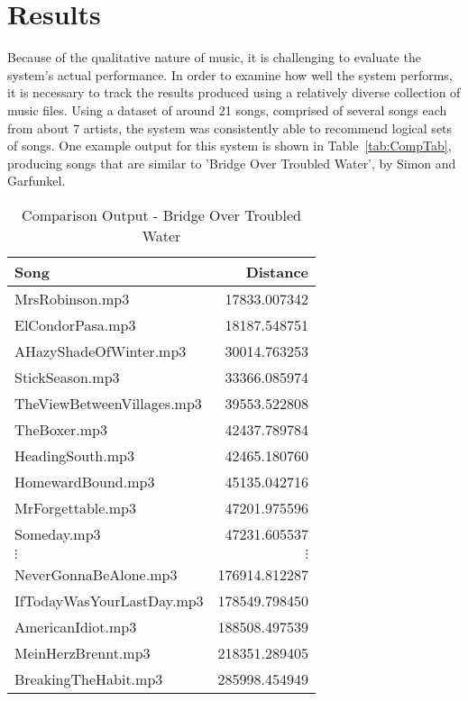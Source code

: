 \documentclass[conference]{IEEEtran}
\begin{document}
\section{Results}\label{sec:results}
Because of the qualitative nature of music, it is challenging to evaluate the system's actual performance. In order to examine how well the system performs, it is necessary to track the results produced using a relatively diverse collection of music files. Using a dataset of around 21 songs, comprised of several songs each from about 7 artists, the system was consistently able to recommend logical sets of songs. One example output for this system is shown in Table~\eqref{tab:CompTab}, producing songs that are similar to 'Bridge Over Troubled Water', by Simon and Garfunkel.

\begin{table}[htbp]
    \centering
    \caption{Comparison Output - Bridge Over Troubled Water}\label{tab:CompTab}
    \begin{tabular}{lr}
      \toprule
      \textbf{Song} & \textbf{Distance} \\
      \midrule
      MrsRobinson.mp3 & 17833.007342 \\
      ElCondorPasa.mp3 & 18187.548751 \\
      AHazyShadeOfWinter.mp3 & 30014.763253 \\
      StickSeason.mp3 & 33366.085974 \\
      TheViewBetweenVillages.mp3 & 39553.522808 \\
      TheBoxer.mp3 & 42437.789784 \\
      HeadingSouth.mp3 & 42465.180760 \\
      HomewardBound.mp3 & 45135.042716 \\
      MrForgettable.mp3 & 47201.975596 \\
      Someday.mp3 & 47231.605537 \\
      \midrule
      $\vdots$ & $\vdots$ \\
      \midrule
      NeverGonnaBeAlone.mp3 & 176914.812287 \\
      IfTodayWasYourLastDay.mp3 & 178549.798450 \\
      AmericanIdiot.mp3 & 188508.497539 \\
      MeinHerzBrennt.mp3 & 218351.289405 \\
      BreakingTheHabit.mp3 & 285998.454949 \\
      \bottomrule
    \end{tabular}
  \end{table}
\end{document}
